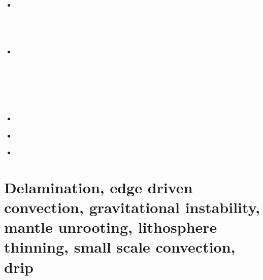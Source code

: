 \begin{small}
\begin{itemize}
 \\
 \\
 \\
\item[\twothousandeighteen]
 \\
 \\
 \\
 \\
\item[\twothousandnineteen] 
 \\
 \\
 \\
 \\
 \\
 \\
\item[\twothousandtwenty] 
\\
\item[\twothousandtwentythree] 
 \\
\item[\twothousandtwentyfour] 
\end{itemize}
\end{small}


\section{Delamination, edge driven convection, gravitational instability, 
mantle unrooting, lithosphere thinning, small scale convection, drip} 


